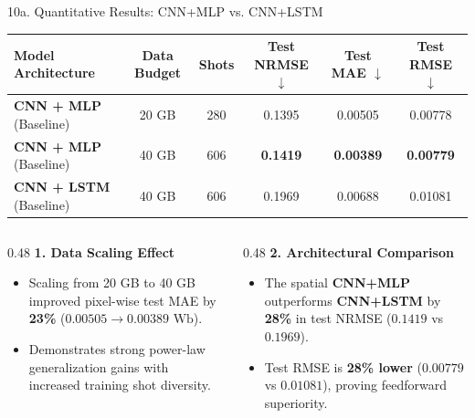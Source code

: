 \documentclass[aspectratio=169, 10pt]{beamer}
\begin{document}
\begin{frame}{10a. Quantitative Results: CNN+MLP vs. CNN+LSTM}
  \vspace{-2pt}
  \begin{table}[h]
    \centering
    \small
    \renewcommand{\arraystretch}{1.25}
    \begin{tabular}{l c c c c c}
      \toprule
      \textbf{Model Architecture} & \textbf{Data Budget} & \textbf{Shots} & \textbf{Test NRMSE} $\downarrow$ & \textbf{Test MAE} $\downarrow$ & \textbf{Test RMSE} $\downarrow$ \\
      \midrule
      \textbf{CNN + MLP} (Baseline) & 20 GB & 280 & 0.1395 & 0.00505 & 0.00778 \\
      \addlinespace[4pt]
      \textbf{CNN + MLP} (Baseline) & 40 GB & 606 & \textbf{0.1419} & \textbf{0.00389} & \textbf{0.00779} \\
      \addlinespace[4pt]
      \textbf{CNN + LSTM} (Baseline) & 40 GB & 606 & 0.1969 & 0.00688 & 0.01081 \\
      \bottomrule
    \end{tabular}
  \end{table}

  \vspace{8pt}
  \begin{columns}[T]
    \begin{column}{0.48\textwidth}
      \textbf{\color{NavyBlue} 1. Data Scaling Effect}
      \begin{itemize}
        \item Scaling from 20 GB to 40 GB improved pixel-wise test MAE by \textbf{23\%} ($0.00505 \to 0.00389\text{ Wb}$).
        \item Demonstrates strong power-law generalization gains with increased training shot diversity.
      \end{itemize}
    \end{column}

    \begin{column}{0.48\textwidth}
      \textbf{\color{NavyBlue} 2. Architectural Comparison}
      \begin{itemize}
        \item The spatial \textbf{CNN+MLP} outperforms \textbf{CNN+LSTM} by \textbf{28\%} in test NRMSE ($0.1419$ vs $0.1969$).
        \item Test RMSE is \textbf{28\% lower} ($0.00779$ vs $0.01081$), proving feedforward superiority.
      \end{itemize}
    \end{column}
  \end{columns}
\end{frame}
\end{document}
